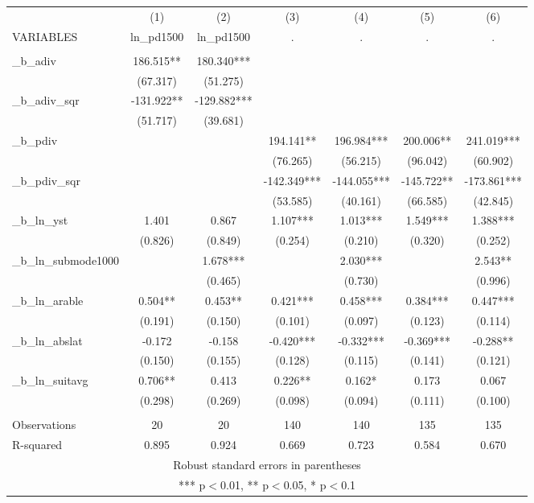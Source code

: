 \documentclass[]{article}
\begin{document}
\begin{tabular}{lcccccc} \hline
 & (1) & (2) & (3) & (4) & (5) & (6) \\
VARIABLES & ln\_pd1500 & ln\_pd1500 & . & . & . & . \\ \hline
 &  &  &  &  &  &  \\
\_b\_adiv & 186.515** & 180.340*** &  &  &  &  \\
 & (67.317) & (51.275) &  &  &  &  \\
\_b\_adiv\_sqr & -131.922** & -129.882*** &  &  &  &  \\
 & (51.717) & (39.681) &  &  &  &  \\
\_b\_pdiv &  &  & 194.141** & 196.984*** & 200.006** & 241.019*** \\
 &  &  & (76.265) & (56.215) & (96.042) & (60.902) \\
\_b\_pdiv\_sqr &  &  & -142.349*** & -144.055*** & -145.722** & -173.861*** \\
 &  &  & (53.585) & (40.161) & (66.585) & (42.845) \\
\_b\_ln\_yst & 1.401 & 0.867 & 1.107*** & 1.013*** & 1.549*** & 1.388*** \\
 & (0.826) & (0.849) & (0.254) & (0.210) & (0.320) & (0.252) \\
\_b\_ln\_submode1000 &  & 1.678*** &  & 2.030*** &  & 2.543** \\
 &  & (0.465) &  & (0.730) &  & (0.996) \\
\_b\_ln\_arable & 0.504** & 0.453** & 0.421*** & 0.458*** & 0.384*** & 0.447*** \\
 & (0.191) & (0.150) & (0.101) & (0.097) & (0.123) & (0.114) \\
\_b\_ln\_abslat & -0.172 & -0.158 & -0.420*** & -0.332*** & -0.369*** & -0.288** \\
 & (0.150) & (0.155) & (0.128) & (0.115) & (0.141) & (0.121) \\
\_b\_ln\_suitavg & 0.706** & 0.413 & 0.226** & 0.162* & 0.173 & 0.067 \\
 & (0.298) & (0.269) & (0.098) & (0.094) & (0.111) & (0.100) \\
 &  &  &  &  &  &  \\
Observations & 20 & 20 & 140 & 140 & 135 & 135 \\
 R-squared & 0.895 & 0.924 & 0.669 & 0.723 & 0.584 & 0.670 \\ \hline
\multicolumn{7}{c}{ Robust standard errors in parentheses} \\
\multicolumn{7}{c}{ *** p$<$0.01, ** p$<$0.05, * p$<$0.1} \\
\end{tabular}
\end{document}
